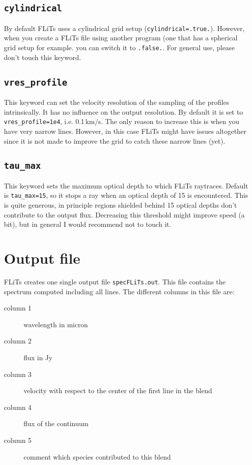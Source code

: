 \documentclass[12pt]{article}
\begin{document}
\subsection*{\texttt{cylindrical}}

By default FLiTs uses a cylindrical grid setup (\texttt{cylindrical=.true.}). However, when you create a FLiTs file using another program (one that has a spherical grid setup for example. you can switch it to \texttt{.false.}. For general use, please don't touch this keyword. 

\subsection*{\texttt{vres\_profile}}

This keyword can set the velocity resolution of the sampling of the profiles intrinsically. It has no influence on the output resolution. By default it is set to \texttt{vres\_profile=1e4}, i.e. 0.1\,km/s. The only reason to increase this is when you have very narrow lines. However, in this case FLiTs might have issues altogether since it is not made to improve the grid to catch these narrow lines (yet).

\subsection*{\texttt{tau\_max}}

This keyword sets the maximum optical depth to which FLiTs raytraces. Default is \texttt{tau\_max=15}, so it stops a ray when an optical depth of 15 is encountered. This is quite generous, in principle regions shielded behind 15 optical depths don't contribute to the output flux. Decreasing this threshold might improve speed (a bit), but in general I would recommend not to touch it.

\section{Output file}

FLiTs creates one single output file \texttt{specFLiTs.out}. This file contains the spectrum computed including all lines. The different columns in this file are:
\begin{description}
\item[column 1] wavelength in micron
\item[column 2] flux in Jy
\item[column 3] velocity with respect to the center of the first line in the blend
\item[column 4] flux of the continuum
\item[column 5] comment which species contributed to this blend
\end{description}
\end{document}
